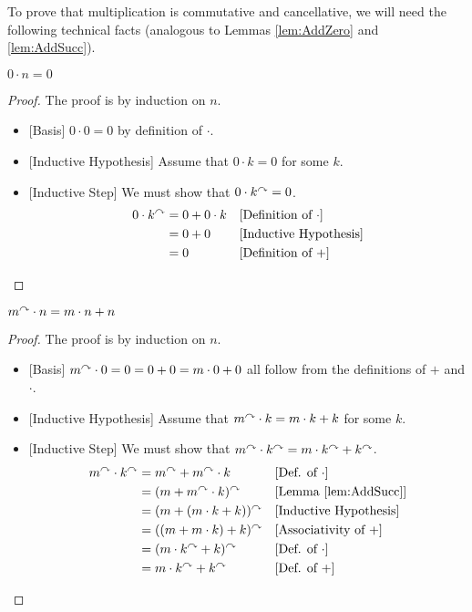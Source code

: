 To prove that multiplication is commutative and cancellative, we will
need the following technical facts (analogous to Lemmas
\ref{lem:AddZero} and \ref{lem:AddSucc}).

\begin{lemma}\label{lem:MultZero}
  $0\cdot n = 0$

  \begin{proof}
    The proof is by induction on $n$.
    \begin{itemize}
    \item{}[Basis] $0\cdot 0 = 0$ by definition of $\cdot$.
    \item{}[Inductive Hypothesis] Assume that $0\cdot k = 0$ for some
      $k$.
    \item{}[Inductive Step] We must show that $0\cdot k^\curvearrowright = 0$.
      \begin{align*}
        0\cdot k^\curvearrowright &= 0 + 0\cdot k &&\text{[Definition of $\cdot$]}\\
        &= 0 + 0 &&\text{[Inductive Hypothesis]}\\
        &= 0&&\text{[Definition of $+$]}
      \end{align*}
    \end{itemize}
  \end{proof}
\end{lemma}

\ipadbreak

\begin{lemma}\label{lem:MultSucc}
  $m^\curvearrowright \cdot n = m\cdot n + n$

 \begin{proof}
   The proof is by induction on $n$.
   \begin{itemize}
   \item{}[Basis] $m^\curvearrowright\cdot 0 = 0 = 0+0 = m\cdot 0 + 0$ all follow
     from the definitions of $+$ and $\cdot$.
   \item{}[Inductive Hypothesis] Assume that $m^\curvearrowright\cdot k = m\cdot k +
     k$ for some $k$.
   \item{}[Inductive Step] We must show that $m^\curvearrowright\cdot k^\curvearrowright =
     m\cdot k^\curvearrowright + k^\curvearrowright$.
     \begin{align*}
       m^\curvearrowright\cdot k^\curvearrowright &= m^\curvearrowright + m^\curvearrowright\cdot k &&\text{[Def. of $\cdot$]}\\
       &= (m + m^\curvearrowright\cdot k)^\curvearrowright &&\text{[Lemma \ref{lem:AddSucc}]}\\
       &= (m + (m\cdot k + k))^\curvearrowright && \text{[Inductive Hypothesis]}\\
       &= ((m+ m\cdot k) + k)^\curvearrowright &&\text{[Associativity of $+$]}\\
       &= (m\cdot k^\curvearrowright + k)^\curvearrowright &&\text{[Def. of $\cdot$]}\\
       &= m\cdot k^\curvearrowright + k^\curvearrowright &&\text{[Def. of $+$]}
     \end{align*}
   \end{itemize}
 \end{proof}
\end{lemma}

